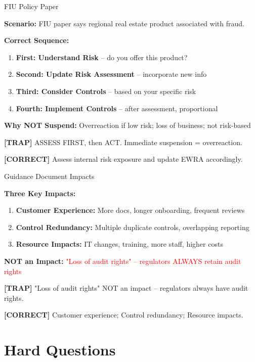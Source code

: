 \documentclass[8pt,aspectratio=169,fontsize=7pt]{beamer}
\renewcommand{\tiny}{\fontsize{4pt}{5pt}\selectfont}
\renewcommand{\normalsize}{\fontsize{8pt}{9pt}\selectfont}
\newcommand{\trap}[1]{%
	\begin{block}{\textcolor{redtrap}{\textbf{[TRAP]}}}
		\textcolor{redtrap}{\tiny #1}
	\end{block}
}
\newcommand{\correct}[1]{%
	\begin{block}{\textcolor{greencorrect}{\textbf{[CORRECT]}}}
		\textcolor{greencorrect}{\tiny #1}
	\end{block}
}
\begin{document}
	\begin{frame}{\normalsize FIU Policy Paper}
		
		\textbf{Scenario:} FIU paper says regional real estate product associated with fraud.
		
		\textbf{Correct Sequence:}
		\begin{enumerate}
			\item \textbf{First: Understand Risk} -- do you offer this product?
			\item \textbf{Second: Update Risk Assessment} -- incorporate new info
			\item \textbf{Third: Consider Controls} -- based on your specific risk
			\item \textbf{Fourth: Implement Controls} -- after assessment, proportional
		\end{enumerate}
		
		\textbf{Why NOT Suspend:} Overreaction if low risk; loss of business; not risk-based
		
		\trap{ASSESS FIRST, then ACT. Immediate suspension = overreaction.}
		
		\correct{Assess internal risk exposure and update EWRA accordingly.}
	\end{frame}
	
	\begin{frame}{\normalsize Guidance Document Impacts}
		
		\textbf{Three Key Impacts:}
		\begin{enumerate}
			\item \textbf{Customer Experience:} More docs, longer onboarding, frequent reviews
			\item \textbf{Control Redundancy:} Multiple duplicate controls, overlapping reporting
			\item \textbf{Resource Impacts:} IT changes, training, more staff, higher costs
		\end{enumerate}
		
		\textbf{NOT an Impact:} \textcolor{red}{"Loss of audit rights" -- regulators ALWAYS retain audit rights}
		
		\trap{"Loss of audit rights" NOT an impact -- regulators always have audit rights.}
		
		\correct{Customer experience; Control redundancy; Resource impacts.}
	\end{frame}
	
	\section{Hard Questions}
	
\end{document}
